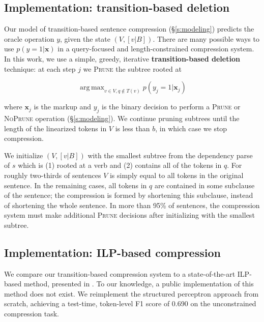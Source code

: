 \documentclass[11pt,a4paper]{article}
\DeclareMathOperator*{\argmaxA}{arg\,max} %
\begin{document}

\subsection{Implementation: transition-based deletion}\label{s:transition}

Our model of transition-based sentence compression (\S\ref{s:modeling}) predicts the oracle operation $y$, given the state $(V,[v|B])$. There are many possible ways to use $p(y=1| \bm{x})$ in a query-focused and length-constrained compression system. In this work, we use a simple, greedy, iterative \textbf{transition-based deletion} technique: at each step $j$ we \textsc{Prune} the subtree rooted at 

$$\argmaxA_{v \in V,q\not\in T(v)}   p(y_j = 1 | \bm{x}_j)$$

\noindent where $\bm{x}_j$ is the markup and $y_j$ is the binary decision to perform a \textsc{Prune} or \textsc{NoPrune} operation (\S\ref{s:modeling}). We continue pruning subtrees until the length of the linearized tokens in $V$ is less than $b$, in which case we stop compression. 

We initialize $(V, [v|B])$ with the smallest subtree from the dependency parse of $s$ which is (1) rooted at a verb and (2) contains all of the tokens in $q$. For roughly two-thirds of sentences $V$ is simply equal to all tokens in the original sentence. In the remaining cases, all tokens in $q$ are contained in some subclause of the sentence; the compression is formed by shortening this subclause, instead of shortening the whole sentence. In more than 95\% of sentences, the compression system must make additional \textsc{Prune} decisions after initializing with the smallest subtree.

\subsection{Implementation: ILP-based compression}\label{s:ilp}

We compare our transition-based compression system to a state-of-the-art ILP-based method, presented in \citet{filippova2013overcoming}. To our knowledge, a public implementation of this method does not exist. We reimplement the structured perceptron approach from scratch, achieving a test-time, token-level F1 score of  0.690 on the unconstrained compression task. 
\end{document}
